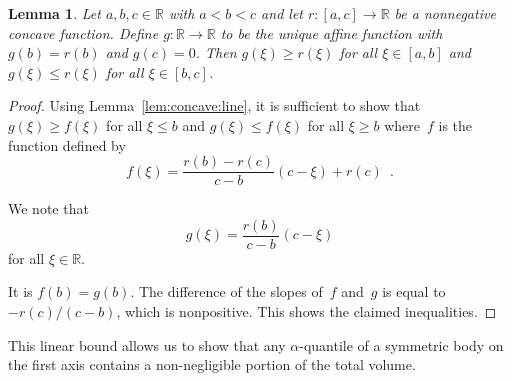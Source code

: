 \documentclass{article}
\newtheorem{lem}[thm]{Lemma}
\newcommand{\IR}{\mathbb{R}}
\renewcommand{\leq}{\leqslant}
\renewcommand{\geq}{\geqslant}
\begin{document}
\begin{lem}\label{lem:concave:line:zero}
Let $a,b,c \in \IR$ with $a<b<c$
and let $r : [a,c]\to \IR$ be a nonnegative concave function.
Define $g:\IR \to \IR$ to be the unique affine function with $g(b) = r(b)$ and
$g(c) = 0$.
Then $g(\xi) \geq r(\xi)$ for all $\xi \in [a,b]$ and $g(\xi) \leq r(\xi)$ for
all $\xi \in [b,c]$.
\end{lem}
\begin{proof}
Using Lemma~\ref{lem:concave:line}, it is sufficient to show that $g(\xi) \geq
f(\xi)$ for all $\xi\leq b$ and $g(\xi) \leq f(\xi)$ for all $\xi\geq b$
where~$f$ is the function defined by
\begin{equation}
f(\xi)
=
\frac{r(b)-r(c)}{c-b} (c- \xi) + r(c)
\enspace.
\end{equation}

We note that
\begin{equation}
g(\xi)
=
\frac{r(b)}{c-b} (c- \xi)
\end{equation}
for all $\xi\in \IR$.

It is $f(b) = g(b)$.
The difference of the slopes of~$f$ and~$g$ is equal to $-r(c)/(c-b)$, which is
nonpositive.
This shows the claimed inequalities.
\end{proof}

This linear bound allows us to show that any $\alpha$-quantile of a symmetric
body on the first axis contains a non-negligible portion of the total volume.
\end{document}
